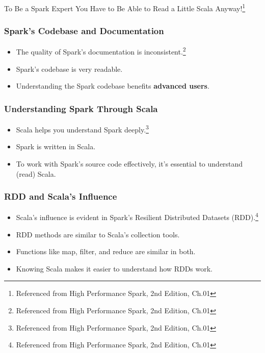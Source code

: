 \begin{frame}
    \begin{center}
        \begin{tcolorbox}[colback=blue!5!white,colframe=blue!75!black,title=Attention!]
            To Be a Spark Expert You Have to Be Able to Read a Little Scala Anyway!\footnote{Referenced from High Performance Spark, 2nd Edition, Ch.01}
        \end{tcolorbox}
    \end{center}

\end{frame}

%
\begin{frame}
    \frametitle{Spark's Codebase and Documentation}
    \begin{itemize}
        \item The quality of Spark's documentation is inconsistent.\footnote{Referenced from High Performance Spark, 2nd Edition, Ch.01}
        \item Spark's codebase is very readable.
        \item Understanding the Spark codebase benefits \textbf{advanced users}.
    \end{itemize}

\end{frame}

\begin{frame}
    \frametitle{Understanding Spark Through Scala}
    \begin{itemize}
        \item Scala helps you understand Spark deeply.\footnote{Referenced from High Performance Spark, 2nd Edition, Ch.01}
        \item Spark is written in Scala.
        \item To work with Spark's source code effectively, it's essential to understand (read) Scala.
    \end{itemize}

\end{frame}

\begin{frame}
    \frametitle{RDD and Scala's Influence}
    \begin{itemize}
        \item Scala's influence is evident in Spark's Resilient Distributed Datasets (RDD).\footnote{Referenced from High Performance Spark, 2nd Edition, Ch.01}
        \item RDD methods are similar to Scala's collection tools.
        \item Functions like map, filter, and reduce are similar in both.
        \item Knowing Scala makes it easier to understand how RDDs work.
    \end{itemize}

\end{frame}

